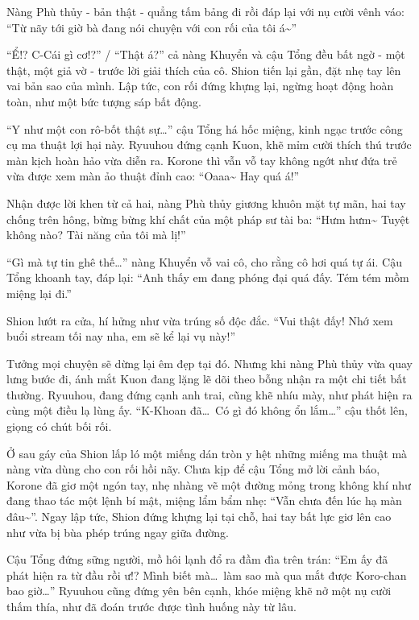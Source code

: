 \documentclass[../main.tex]{subfiles}
\begin{document}
Nàng Phù thủy - bản thật - quẳng tấm bảng đi rồi đáp lại với nụ cười vênh váo: ``Từ nãy tới giờ bà đang nói chuyện với con rối của tôi á\~{}''

``Ể!? C-Cái gì cơ!?'' / ``Thật á?'' cả nàng Khuyển và cậu Tổng đều bất ngờ - một thật, một giả vờ - trước lời giải thích của cô. Shion tiến lại gần, đặt nhẹ tay lên vai bản sao của mình. Lập tức, con rối đứng khựng lại, ngừng hoạt động hoàn toàn, như một bức tượng sáp bất động.

``Y như một con rô-bốt thật sự\dots'' cậu Tổng há hốc miệng, kinh ngạc trước công cụ ma thuật lợi hại này. Ryuuhou đứng cạnh Kuon, khẽ mỉm cười thích thú trước màn kịch hoàn hảo vừa diễn ra. Korone thì vẫn vỗ tay không ngớt như đứa trẻ vừa được xem màn ảo thuật đỉnh cao: ``Oaaa\~{} Hay quá á!''

Nhận được lời khen từ cả hai, nàng Phù thủy giương khuôn mặt tự mãn, hai tay chống trên hông, bừng bừng khí chất của một pháp sư tài ba: ``Hưm hưm\~{} Tuyệt không nào? Tài năng của tôi mà lị!''

``Gì mà tự tin ghê thế\dots'' nàng Khuyển vỗ vai cô, cho rằng cô hơi quá tự ái. Cậu Tổng khoanh tay, đáp lại: ``Anh thấy em đang phóng đại quá đấy. Tém tém mồm miệng lại đi.''

Shion lướt ra cửa, hí hửng như vừa trúng số độc đắc. ``Vui thật đấy! Nhớ xem buổi stream tối nay nha, em sẽ kể lại vụ này!''

Tưởng mọi chuyện sẽ dừng lại êm đẹp tại đó. Nhưng khi nàng Phù thủy vừa quay lưng bước đi, ánh mắt Kuon đang lặng lẽ dõi theo bỗng nhận ra một chi tiết bất thường. Ryuuhou, đang đứng cạnh anh trai, cũng khẽ nhíu mày, như phát hiện ra cùng một điều lạ lùng ấy. ``K-Khoan đã\dots\ Có gì đó không ổn lắm\dots'' cậu thốt lên, giọng có chút bối rối.

Ở sau gáy của Shion lấp ló một miếng dán tròn y hệt những miếng ma thuật mà nàng vừa dùng cho con rối hồi nãy. Chưa kịp để cậu Tổng mở lời cảnh báo, Korone đã giơ một ngón tay, nhẹ nhàng vẽ một đường mỏng trong không khí như đang thao tác một lệnh bí mật, miệng lẩm bẩm nhẹ: ``Vẫn chưa đến lúc hạ màn đâu\~{}''. Ngay lập tức, Shion đứng khựng lại tại chỗ, hai tay bất lực giơ lên cao như vừa bị bùa phép trúng ngay giữa đường.


Cậu Tổng đứng sững người, mồ hôi lạnh đổ ra đầm đìa trên trán: ``Em ấy đã phát hiện ra từ đầu rồi ư!? Mình biết mà\dots\ làm sao mà qua mắt được Koro-chan bao giờ\dots'' Ryuuhou cũng đứng yên bên cạnh, khóe miệng khẽ nở một nụ cười thấm thía, như đã đoán trước được tình huống này từ lâu.
\end{document}
